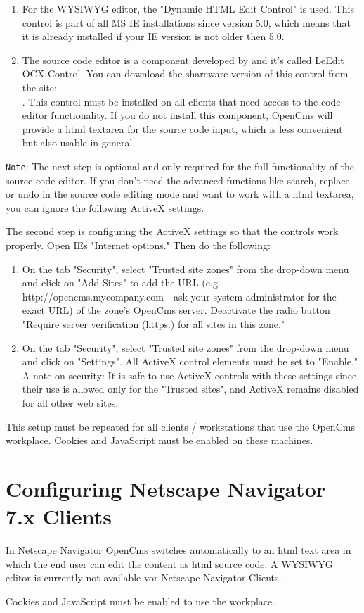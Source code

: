 \begin{enumerate}
\item For the WYSIWYG editor, the "Dynamic HTML Edit Control" is
used. This control is part of all MS IE installations since
version 5.0, which means that it is already installed if your IE version 
is not older then 5.0. 

\item The source code editor is a component developed by 
     and it's
called LeEdit OCX Control. You can download the shareware version
of this control from the site:\\
.
This control must be installed on all clients that need access to
the code editor functionality.
If you do not install this component, OpenCms will provide a html
textarea for the source code input, which is less convenient but
also usable in general.
\end{enumerate}

\texttt{Note}: The next step is optional and only required for the full functionality of the source code editor.
If you don't need the advanced functions like search, replace or undo in the source code editing mode 
and want to work with a html textarea, 
you can ignore the following ActiveX settings.

The second step is configuring the ActiveX settings so that the
controls work properly.
Open IEs "Internet options." Then do the
following:

\begin{enumerate}
\item On the tab "Security", select "Trusted site zones" from the
drop-down menu and click on "Add Sites" to add the URL (e.g.
http://opencms.mycompany.com - ask your system administrator for
the exact URL) of the zone's OpenCms server. Deactivate the radio
button "Require server verification (https:) for all sites in this
zone."
\item On the tab "Security", select "Trusted site zones"
from the drop-down menu and click on "Settings". All ActiveX
control elements must be set to "Enable." A note on security: It
is safe to use ActiveX controls with these settings since their
use is allowed only for the "Trusted sites", and ActiveX remains
disabled for all other web sites.
\end{enumerate}

This setup must be repeated for all clients / workstations that
use the OpenCms workplace. Cookies and JavaScript must be enabled 
on these machines.


\section{Configuring Netscape Navigator 7.x Clients}

In Netscape Navigator OpenCms switches automatically to an html 
text area in which the end user can edit the content as html 
source code. A WYSIWYG editor is currently not available vor
Netscape Navigator Clients.

Cookies and JavaScript must be enabled to use the workplace.
